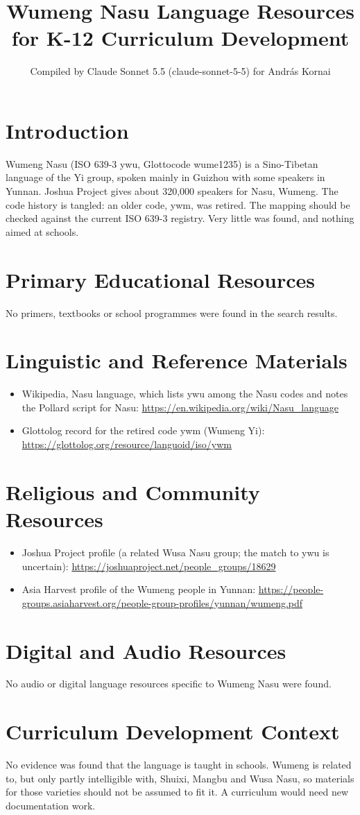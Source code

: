 \documentclass[12pt]{article}
\title{Wumeng Nasu Language Resources for K-12 Curriculum Development}
\author{Compiled by Claude Sonnet 5.5 (claude-sonnet-5-5) for Andr\'as Kornai}
\date{}
\begin{document}
\maketitle

\section{Introduction}
Wumeng Nasu (ISO 639-3 ywu, Glottocode wume1235) is a Sino-Tibetan language of the Yi group, spoken mainly in Guizhou with some speakers in Yunnan. Joshua Project gives about 320,000 speakers for Nasu, Wumeng. The code history is tangled: an older code, ywm, was retired. The mapping should be checked against the current ISO 639-3 registry. Very little was found, and nothing aimed at schools.

\section{Primary Educational Resources}
No primers, textbooks or school programmes were found in the search results.

\section{Linguistic and Reference Materials}
\begin{itemize}
\item Wikipedia, Nasu language, which lists ywu among the Nasu codes and notes the Pollard script for Nasu: \url{https://en.wikipedia.org/wiki/Nasu_language}
\item Glottolog record for the retired code ywm (Wumeng Yi): \url{https://glottolog.org/resource/languoid/iso/ywm}
\end{itemize}

\section{Religious and Community Resources}
\begin{itemize}
\item Joshua Project profile (a related Wusa Nasu group; the match to ywu is uncertain): \url{https://joshuaproject.net/people_groups/18629}
\item Asia Harvest profile of the Wumeng people in Yunnan: \url{https://people-groups.asiaharvest.org/people-group-profiles/yunnan/wumeng.pdf}
\end{itemize}

\section{Digital and Audio Resources}
No audio or digital language resources specific to Wumeng Nasu were found.

\section{Curriculum Development Context}
No evidence was found that the language is taught in schools. Wumeng is related to, but only partly intelligible with, Shuixi, Mangbu and Wusa Nasu, so materials for those varieties should not be assumed to fit it. A curriculum would need new documentation work.
\end{document}
